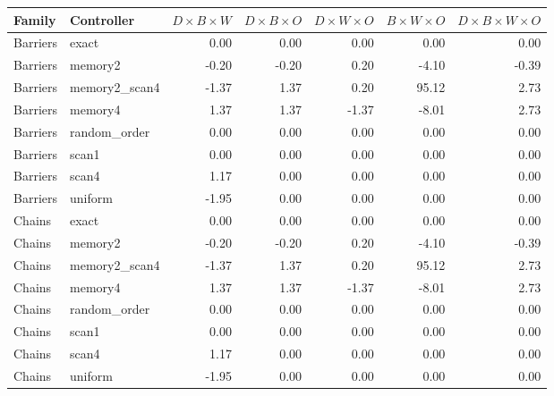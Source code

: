 \begin{tabular}{llrrrrr}
\toprule
Family & Controller & $D\times{} B\times{} W$ & $D\times{} B\times{} O$ & $D\times{} W\times{} O$ & $B\times{} W\times{} O$ & $D\times{} B\times{} W\times{} O$\\
\midrule
Barriers & exact & 0.00 & 0.00 & 0.00 & 0.00 & 0.00\\
Barriers & memory2 & -0.20 & -0.20 & 0.20 & -4.10 & -0.39\\
Barriers & memory2\_scan4 & -1.37 & 1.37 & 0.20 & 95.12 & 2.73\\
Barriers & memory4 & 1.37 & 1.37 & -1.37 & -8.01 & 2.73\\
Barriers & random\_order & 0.00 & 0.00 & 0.00 & 0.00 & 0.00\\
Barriers & scan1 & 0.00 & 0.00 & 0.00 & 0.00 & 0.00\\
Barriers & scan4 & 1.17 & 0.00 & 0.00 & 0.00 & 0.00\\
Barriers & uniform & -1.95 & 0.00 & 0.00 & 0.00 & 0.00\\
Chains & exact & 0.00 & 0.00 & 0.00 & 0.00 & 0.00\\
Chains & memory2 & -0.20 & -0.20 & 0.20 & -4.10 & -0.39\\
Chains & memory2\_scan4 & -1.37 & 1.37 & 0.20 & 95.12 & 2.73\\
Chains & memory4 & 1.37 & 1.37 & -1.37 & -8.01 & 2.73\\
Chains & random\_order & 0.00 & 0.00 & 0.00 & 0.00 & 0.00\\
Chains & scan1 & 0.00 & 0.00 & 0.00 & 0.00 & 0.00\\
Chains & scan4 & 1.17 & 0.00 & 0.00 & 0.00 & 0.00\\
Chains & uniform & -1.95 & 0.00 & 0.00 & 0.00 & 0.00\\
\bottomrule
\end{tabular}